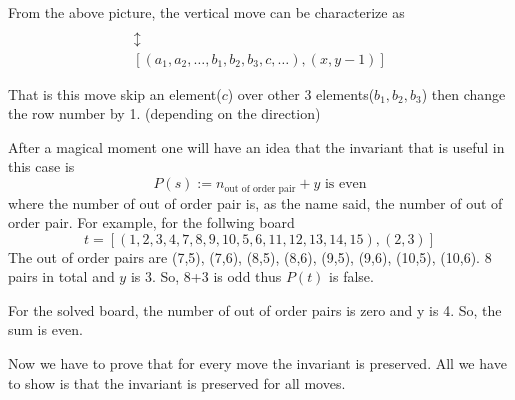 \documentclass[a4paper, 12pt]{article}
\theoremstyle{examplestyle}
\begin{document}
\begin{multicols}{2}
\begin{enumerate}
	\begin{center}
	\end{center}
	
	From the above picture, the vertical move can be characterize as
	\begin{gather*}
		[(a_1, a_2, \ldots, c, b_1, b_2, b_3,\ldots ), (x,y)]\\
		\updownarrow\\
		[(a_1, a_2, \ldots, b_1, b_2, b_3,c, \ldots ), (x,y-1)]
	\end{gather*}
	
	That is this move skip an element($c$) over other 3 elements($b_1, b_2, b_3$) then change the row number by 1. (depending on the direction)
	
	After a magical moment one will have an idea that the invariant that is useful in this case is
	\[
		P(s) := n_\text{out of order pair} + y \text{ is even}
	\]
	where the number of out of order pair is, as the name said, the number of out of order pair. For example, for the follwing board
	\[
	t = [(1,2,3,4,7,8,9,10,5,6,11,12,13,14,15), (2,3)]
	\]
	The out of order pairs are (7,5), (7,6), (8,5), (8,6), (9,5), (9,6), (10,5), (10,6). 8 pairs in total and $y$ is 3. So, 8+3 is odd thus $P(t)$ is false.
	
	For the solved board, the number of out of order pairs is zero and y is 4. So, the sum is even.
	
	Now we have to prove that for every move the invariant is preserved. All we have to show is that the invariant is preserved for all moves.
	

\end{enumerate}
\end{multicols}
\end{document}
